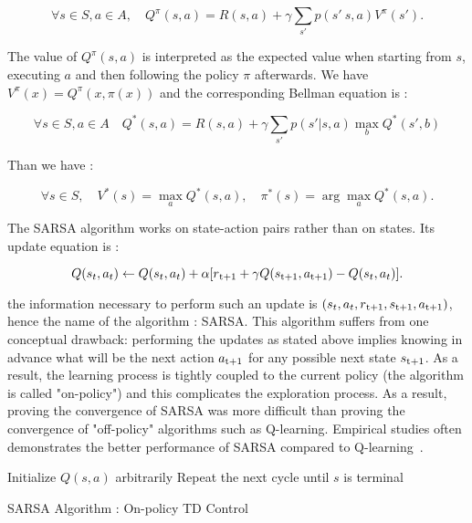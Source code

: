 \begin{equation}
	\forall s \in S, a \in A, \quad Q^\pi (s,a) = R(s, a) + \gamma \sum_{s'} p(s' \ s, a) V^\pi (s').
\end{equation}

The value of $Q^\pi(s,a)$ is interpreted as the expected value when starting from $s$, executing $a$ and then following the policy $\pi$ afterwards. We have $V^\pi(x) = Q^\pi(x, \pi(x))$ and the corresponding Bellman equation is :

\begin{equation}
	\forall s \in S, a \in A \quad Q^*(s, a) = R(s, a) + \gamma \sum_{s'}p(s' | s, a) \max_{b} Q^*(s', b)
\end{equation}

Than we have :

\begin{equation}
\forall s \in S, \quad V^*(s) = \max_{a} Q^* (s,a ), \quad \pi^*(s) = \arg\max_{a} Q^*(s,a).
\end{equation}

The SARSA algorithm works on state-action pairs rather than on states. Its update equation is :

\begin{equation}
\label{eq:2.12}
Q(s_t, a_t) \leftarrow Q(s_t, a_t) + \alpha[r\textsubscript{t+1} + \gamma Q(s\textsubscript{t+1}, a\textsubscript{t+1}) - Q(s_t, a_t)].
\end{equation}

the information necessary to perform such an update is $(s_t, a_t, r\textsubscript{t+1}, s\textsubscript{t+1}, a\textsubscript{t+1})$, hence the name of the algorithm : SARSA. This algorithm suffers from one conceptual drawback: performing the updates as stated above implies knowing in advance what will be the next action $a\textsubscript{t+1}$ for any possible next state $s\textsubscript{t+1}$.  As a result, the learning process is tightly coupled to the current policy (the algorithm is called "on-policy") and this complicates the exploration process. As a result, proving the convergence of SARSA was more difficult than proving the convergence of "off-policy" algorithms such as Q-learning. Empirical studies often demonstrates the better performance of SARSA compared to Q-learning~\cite{Sigaud:2010:MDP:1841781}.

\begin{algorithm}
	Initialize $Q(s, a)$ arbitrarily\;
	Repeat the next cycle until $s$ is terminal\;
\caption{SARSA Algorithm : On-policy TD Control}
\end{algorithm}

